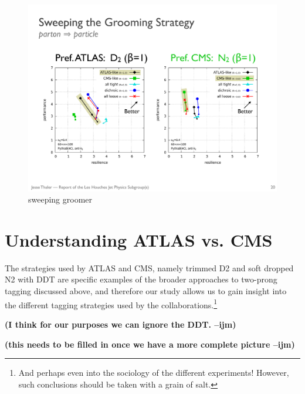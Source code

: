 \documentclass[11pt,letterpaper]{article}
\newcommand{\ijm}[1]{\textbf{\textcolor{llblue}{(#1 --ijm)}}}
\begin{document}
\begin{figure}
\begin{center}
\includegraphics[width=0.75\columnwidth]{figures/sweep_groom}
\end{center}
\caption{sweeping groomer}
\label{fig:dichroic}
\end{figure}






\section{Understanding ATLAS vs. CMS}\label{sec:exp_compare}

The strategies used by ATLAS and CMS, namely trimmed  D2 \cite{Larkoski:2015kga}\cite{Larkoski:2014gra} and soft dropped N2 \cite{Moult:2016cvt} with DDT \cite{Dolen:2016kst} are specific examples of the broader approaches to two-prong tagging discussed above, and therefore our study allows us to gain insight into the different tagging strategies used by the collaborations.\footnote{And perhaps even into the sociology of the different experiments! However, such conclusions should be taken with a grain of salt.}

\ijm{I think for our purposes we can ignore the DDT. }

\ijm{this needs to be filled in once we have a more complete picture}
\end{document}

